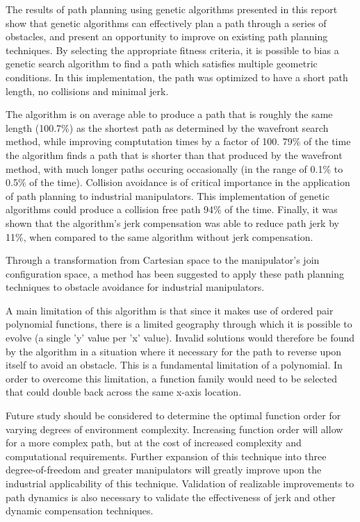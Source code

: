 The results of path planning using genetic algorithms presented in this report show that genetic algorithms can effectively plan a path through a series of obstacles, and present an opportunity to improve on existing path planning techniques. By selecting the appropriate fitness criteria, it is possible to bias a genetic search algorithm to find a path which satisfies multiple geometric conditions. In this implementation, the path was optimized to have a short path length, no collisions and minimal jerk.

The algorithm is on average able to produce a path that is roughly the same length (100.7\%) as the shortest path as determined by the wavefront search method, while improving comptutation times by a factor of 100. 79\% of the time the algorithm finds a path that is shorter than that produced by the wavefront method, with much longer paths occuring occasionally (in the range of 0.1\% to 0.5\% of the time). Collision avoidance is of critical importance in the application of path planning to industrial manipulators. This implementation of genetic algorithms could produce a collision free path 94\% of the time. Finally, it was shown that the algorithm's jerk compensation was able to reduce path jerk by 11\%, when compared to the same algorithm without jerk compensation.

Through a transformation from Cartesian space to the manipulator's join configuration space, a method has been suggested to apply these path planning techniques to obstacle avoidance for industrial manipulators.

A main limitation of this algorithm is that since it makes use of ordered pair polynomial functions, there is a limited geography through which it is possible to evolve (a single 'y' value per 'x' value). Invalid solutions would therefore be found by the algorithm in a situation where it necessary for the path to reverse upon itself to avoid an obstacle. This is a fundamental limitation of a polynomial. In order to overcome this limitation, a function family would need to be selected that could double back across the same x-axis location.

Future study should be considered to determine the optimal function order for varying degrees of environment complexity. Increasing function order will allow for a more complex path, but at the cost of increased complexity and computational requirements. Further expansion of this technique into three degree-of-freedom and greater manipulators will greatly improve upon the industrial applicability of this technique. Validation of realizable improvements to path dynamics is also necessary to validate the effectiveness of jerk and other dynamic compensation techniques.